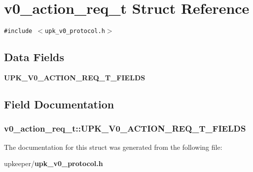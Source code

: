 \section{v0\_\-action\_\-req\_\-t Struct Reference}
\label{structv0__action__req__t}
{\tt \#include $<$upk\_\-v0\_\-protocol.h$>$}

\subsection*{Data Fields}
\begin{CompactItemize}
\item 
\bf{UPK\_\-V0\_\-ACTION\_\-REQ\_\-T\_\-FIELDS}
\end{CompactItemize}


\subsection{Field Documentation}
\subsubsection{\setlength{\rightskip}{0pt plus 5cm}\bf{v0\_\-action\_\-req\_\-t::UPK\_\-V0\_\-ACTION\_\-REQ\_\-T\_\-FIELDS}}\label{structv0__action__req__t_5d6229a2ca28a28b98f40322fbd41ff0}




The documentation for this struct was generated from the following file:\begin{CompactItemize}
\item 
upkeeper/\bf{upk\_\-v0\_\-protocol.h}\end{CompactItemize}
